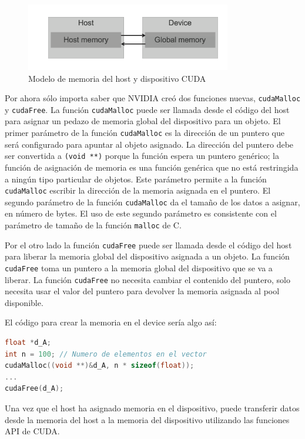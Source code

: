 \begin{figure}[h]
  \centering
  \includegraphics[width=0.8\textwidth]{images/host_memory_global_memory.png}
  \caption{Modelo de memoria del host y dispositivo CUDA}
  \label{fig:host_memory_global_memory}
\end{figure}

Por ahora sólo importa saber que NVIDIA creó dos funciones nuevas, \texttt{cudaMalloc} y \texttt{cudaFree}. La función
\texttt{cudaMalloc} puede ser llamada desde el código del host para asignar un pedazo de memoria global del dispositivo
para un objeto. El primer parámetro de la función \texttt{cudaMalloc} es la dirección de un puntero que será configurado
para apuntar al objeto asignado. La dirección del puntero debe ser convertida a \texttt{(void **)} porque la función
espera un puntero genérico; la función de asignación de memoria es una función genérica que no está restringida a
ningún tipo particular de objetos. Este parámetro permite a la función \texttt{cudaMalloc} escribir la dirección de la
memoria asignada en el puntero. El segundo parámetro de la función \texttt{cudaMalloc} da el tamaño de los datos a
asignar, en número de bytes. El uso de este segundo parámetro es consistente con el parámetro de tamaño de la función
\texttt{malloc} de C.

Por el otro lado la función \texttt{cudaFree} puede ser llamada desde el código del host para liberar la memoria global
del dispositivo asignada a un objeto. La función \texttt{cudaFree} toma un puntero a la memoria global del dispositivo
que se va a liberar. La función \texttt{cudaFree} no necesita cambiar el contenido del puntero, solo necesita usar el
valor del puntero para devolver la memoria asignada al pool disponible.

El código para crear la memoria en el device sería algo así:

\begin{lstlisting}[language=C]
float *d_A;
int n = 100; // Numero de elementos en el vector
cudaMalloc((void **)&d_A, n * sizeof(float));
...
cudaFree(d_A);
\end{lstlisting}

Una vez que el host ha asignado memoria en el dispositivo, puede transferir datos desde la memoria del host a la memoria
del dispositivo utilizando las funciones API de CUDA.

